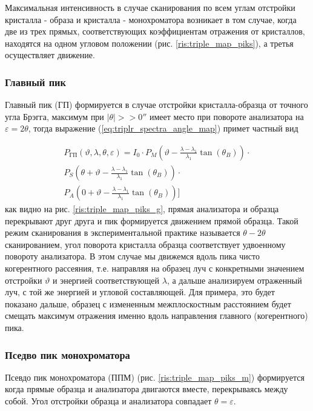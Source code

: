 Максимальная интенсивность в случае сканирования по всем углам отстройки кристалла - образа и
 кристалла - монохроматора
возникает в том случае, когда две из трех прямых, соответствующих коэффициентам отражения от кристаллов,
находятся на одном угловом положении (рис. \ref{ris:triple_map_piks}), а третья осуществляет движение.

\subsubsection*{Главный пик}
Главный пик (ГП) формируется в случае отстройки кристалла-образца от точного угла Брэгга,
максимум при $|\theta|>>0''$ имеет место при повороте анализатора на $\varepsilon = 2\theta$,
тогда выражение (\ref{eq:triplr_spectra_angle_map}) примет частный вид

\begin{eqnarray} \label{eq:triplr_spectra_angle_map_GP}
  P_{\text{ГП}}(\vartheta,\lambda,\theta,\varepsilon) =I_0\cdot
    P_M \left(\vartheta - \frac{\lambda - \lambda_1}{\lambda_1}\tan(\theta_B) \right) \cdot \nonumber \\
   P_S \left(\theta + \vartheta - \frac{\lambda - \lambda_1}{\lambda_1}\tan(\theta_B)\right)  \cdot  \nonumber \\
   P_A \left(0+\vartheta - \frac{\lambda - \lambda_1}{\lambda_1}\tan(\theta_B)\right) \Bigg]
 \end{eqnarray}
как видно на рис. \ref{ris:triple_map_piks_g}, прямая анализатора и образца перекрывают друг друга и пик формируется
движением прямой образца. Такой режим сканирования в экспериментальной практике называется $\theta-2\theta$ сканированием,
угол поворота кристалла образца соответствует удвоенному повороту анализатора. В этом случае мы движемся
вдоль пика чисто когерентного рассеяния, т.е. направляя на образец луч с конкретными значением отстройки $\vartheta$ и энергией соответствующей
 $\lambda$, а дальше анализируем отраженный луч, с той же энергией и угловой составляющей. Для примера, это
 будет показано дальше, образец с измененным межплоскостным расстоянием будет смещать максимум отражения именно вдоль направления
 главного (когерентного) пика.

\subsubsection*{Пседво пик монохроматора}
Псевдо пик монохроматора (ППМ) (рис. \ref{ris:triple_map_piks_m}) формируется когда прямые образца и анализатора
двигаются вместе, перекрываясь между собой. Угол отстройки образца и анализатора совпадает $\theta = \varepsilon$.


